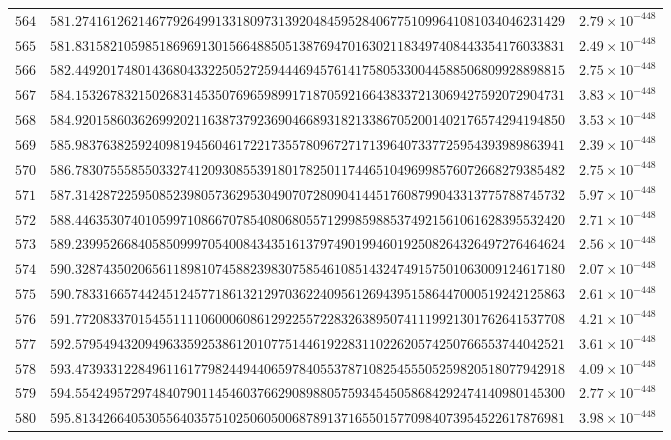 \documentclass[12pt,reqno]{amsart}
\theoremstyle{remark}
\begin{document}
\begin{longtable}{clc}
$564$ & $581.2741612621467792649913318097313920484595284067751099641081034046231429$ & $2.79\times 10^{-448}$ \\
$565$ & $581.8315821059851869691301566488505138769470163021183497408443354176033831$ & $2.49\times 10^{-448}$ \\
$566$ & $582.4492017480143680433225052725944469457614175805330044588506809928898815$ & $2.75\times 10^{-448}$ \\
$567$ & $584.1532678321502683145350769659899171870592166438337213069427592072904731$ & $3.83\times 10^{-448}$ \\
$568$ & $584.9201586036269920211638737923690466893182133867052001402176574294194850$ & $3.53\times 10^{-448}$ \\
$569$ & $585.9837638259240981945604617221735578096727171396407337725954393989863941$ & $2.39\times 10^{-448}$ \\
$570$ & $586.7830755585503327412093085539180178250117446510496998576072668279385482$ & $2.75\times 10^{-448}$ \\
$571$ & $587.3142872259508523980573629530490707280904144517608799043313775788745732$ & $5.97\times 10^{-448}$ \\
$572$ & $588.4463530740105997108667078540806805571299859885374921561061628395532420$ & $2.71\times 10^{-448}$ \\
$573$ & $589.2399526684058509997054008434351613797490199460192508264326497276464624$ & $2.56\times 10^{-448}$ \\
$574$ & $590.3287435020656118981074588239830758546108514324749157501063009124617180$ & $2.07\times 10^{-448}$ \\
$575$ & $590.7833166574424512457718613212970362240956126943951586447000519242125863$ & $2.61\times 10^{-448}$ \\
$576$ & $591.7720833701545511110600060861292255722832638950741119921301762641537708$ & $4.21\times 10^{-448}$ \\
$577$ & $592.5795494320949633592538612010775144619228311022620574250766553744042521$ & $3.61\times 10^{-448}$ \\
$578$ & $593.4739331228496116177982449440659784055378710825455505259820518077942918$ & $4.09\times 10^{-448}$ \\
$579$ & $594.5542495729748407901145460376629089880575934545058684292474140980145300$ & $2.77\times 10^{-448}$ \\
$580$ & $595.8134266405305564035751025060500687891371655015770984073954522617876981$ & $3.98\times 10^{-448}$ \\

\end{longtable}
\end{document}
